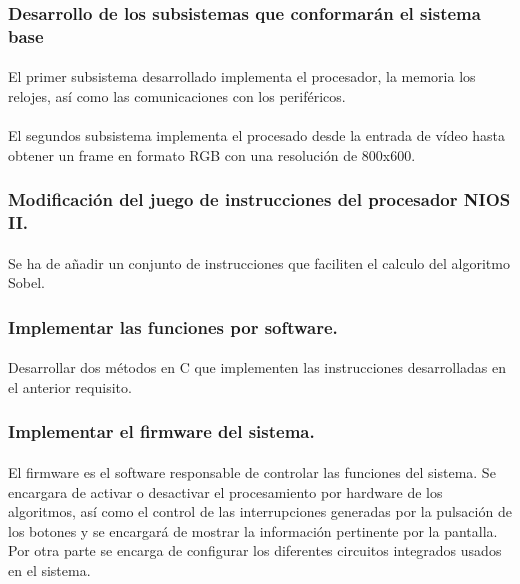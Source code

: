 \documentclass[a4paper,12pt,titlepage,final]{book}
\begin{document}
\subsubsection{Desarrollo de los subsistemas que conformarán el sistema base}

\paragraph{}
El primer subsistema desarrollado implementa el procesador, la memoria los relojes, así como las comunicaciones con los periféricos.

\paragraph{}
El segundos subsistema implementa el procesado desde la entrada de vídeo hasta obtener un frame en formato RGB con una resolución de 800x600.

\subsubsection{Modificación del juego de instrucciones del procesador NIOS II.}
\paragraph{}
Se ha de añadir un conjunto de instrucciones que faciliten el calculo del algoritmo Sobel.

\subsubsection{Implementar las funciones por software.}
\paragraph{}
Desarrollar dos métodos en C que implementen las instrucciones desarrolladas en el anterior requisito.

\subsubsection{Implementar el firmware del sistema.}
\paragraph{}
El firmware es el software responsable de controlar las funciones del sistema. Se encargara de activar o desactivar el procesamiento por hardware de los algoritmos, así como el control de las interrupciones generadas por la pulsación de los botones y se encargará de mostrar la información pertinente por la pantalla. Por otra parte se encarga de configurar los diferentes circuitos integrados usados en el sistema.
\end{document}
